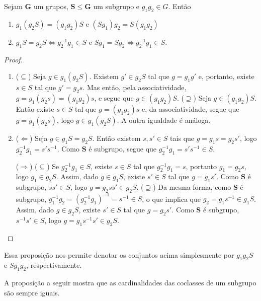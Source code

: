 \begin{proposition}
\label{alge:prop.gru.coclas}
Sejam $\bm G$ um grupos, $\bm S \leq \bm G$ um subgrupo e $g_1g_2 \in G$. Então
	\begin{enumerate}
	\item $g_1(g_2S) = (g_1g_2)S \text{\ \ e\ \ } (Sg_1)g_2 = S(g_1g_2)$
	\item $g_1S=g_2S \Leftrightarrow g_2^{-1}g_1 \in S$ e $Sg_1=Sg_2 \Leftrightarrow g_2^{-1}g_1 \in S$.
	\end{enumerate}
\end{proposition}
\begin{proof}
	\begin{enumerate}
	\item ($\subseteq$) Seja $g \in g_1(g_2S)$. Existem $g' \in g_2S$ tal que $g=g_1g'$ e, portanto, existe $s \in S$ tal que $g'=g_2s$. Mas então, pela associatividade, $g=g_1(g_2s) = (g_1g_2)s$, e segue que $g \in (g_1g_2)S$.
($\supseteq$) Seja $g \in (g_1g_2)S$. Então existe $s \in S$ tal que $g=(g_1g_2)s$ e, da associatividade, segue que $g=g_1(g_2s)$, logo $g \in g_1(g_2S)$. A outra igualdade é análoga.

	\item ($\Leftarrow$) Seja $g \in g_1S=g_2S$. Então existem $s,s' \in S$ tais que $g=g_1s=g_2s'$, logo $g_2^{-1}g_1=s's^{-1}$. Como $\bm S$ é subgrupo, segue que $g_2^{-1}g_1=s's^{-1} \in S$.

\noindent
($\Rightarrow$) ($\subseteq$) Se $g_2^{-1}g_1 \in S$, existe $s \in S$ tal que $g_2^{-1}g_1=s$, portanto $g_1=g_2s$, logo $g_1 \in g_2S$. Assim, dado $g \in g_1S$, existe $s' \in S$ tal que $g=g_1s'$. Como $\bm S$ é subgrupo, $ss' \in S$, logo $g=g_2ss' \in g_2S$. ($\supseteq$) Da mesma forma, como $\bm S$ é subgrupo, $g_1^{-1}g_2=(g_2^{-1}g_1)^{-1}=s^{-1} \in S$, o que implica que $g_2=g_1s^{-1} \in g_1S$. Assim, dado $g \in g_2S$, existe $s' \in S$ tal que $g=g_2s'$. Como $\bm S$ é subgrupo, $s^{-1}s' \in S$, logo $g=g_1s^{-1}s' \in g_2S$.
	\end{enumerate}

\end{proof}

Essa proposição nos permite denotar os conjuntos acima simplesmente por $g_1g_2S$ e $Sg_1g_2$, respectivamente.

A proposição a seguir mostra que as cardinalidades das coclasses de um subgrupo são sempre iguais.


